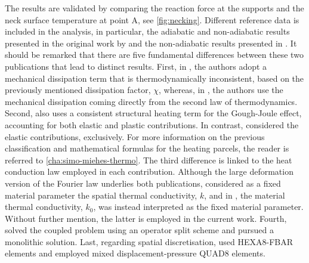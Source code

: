 The results are validated by comparing the reaction force at the supports and the neck surface temperature at point A, see \ref{fig:necking}.
Different reference data is included in the analysis, in particular, the adiabatic and non-adiabatic results presented in the original work by \cite{simo1992AssociativeCoupledThermoplasticity} and the non-adiabatic results presented in \cite{danowski2014ComputationalModellingThermoStructure}.
It should be remarked that there are five fundamental differences between these two publications that lead to distinct results.
First, in \cite{simo1992AssociativeCoupledThermoplasticity}, the authors adopt a mechanical dissipation term that is thermodynamically inconsistent, based on the previously mentioned dissipation factor, $\chi$, whereas, in \cite{danowski2014ComputationalModellingThermoStructure}, the authors use the mechanical dissipation coming directly from the second law of thermodynamics.
Second, \cite{danowski2014ComputationalModellingThermoStructure} also uses a consistent structural heating term for the Gough-Joule effect, accounting for both elastic and plastic contributions.
In contrast, \cite{simo1992AssociativeCoupledThermoplasticity} considered the elastic contributions, exclusively.
For more information on the previous classification and mathematical formulas for the heating parcels, the reader is referred to \ref{cha:simo-miehes-thermo}.
The third difference is linked to the heat conduction law employed in each contribution.
Although the large deformation version of the Fourier law underlies both publications, \cite{simo1992AssociativeCoupledThermoplasticity} considered as a fixed material parameter the spatial thermal conductivity, $k$, and in \cite{danowski2014ComputationalModellingThermoStructure}, the material thermal conductivity, $k_{0}$, was instead interpreted as the fixed material parameter.
Without further mention, the latter is employed in the current work.
Fourth, \cite{simo1992AssociativeCoupledThermoplasticity} solved the coupled problem using an operator split scheme and \cite{danowski2014ComputationalModellingThermoStructure} pursued a monolithic solution.
Last, regarding  spatial discretisation, \cite{danowski2014ComputationalModellingThermoStructure} used HEXA8-FBAR elements and \cite{simo1992AssociativeCoupledThermoplasticity} employed mixed displacement-pressure QUAD8 elements.

